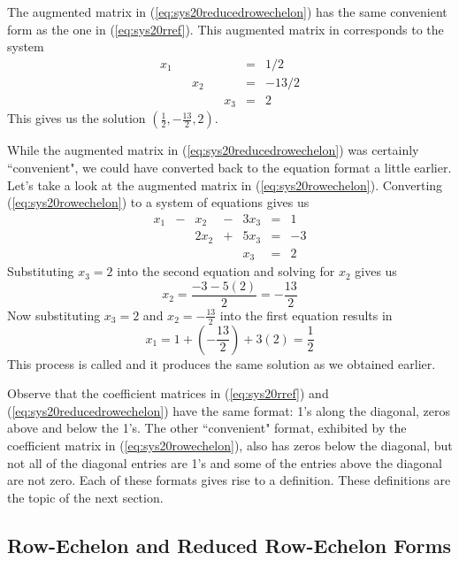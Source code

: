 \documentclass{ximera}
\begin{document}
\begin{exploration}
The augmented matrix in (\ref{eq:sys20reducedrowechelon}) has the same convenient form as the one in (\ref{eq:sys20rref}).  This augmented matrix in corresponds to the system
\begin{equation*}
    \begin{array}{ccccccc}
      x_1 & &&&&= &1/2 \\
   & &x_2&&&=&-13/2\\
   & &&&x_3&=&2
        \end{array}
    \end{equation*}
This gives us the solution $(\frac{1}{2}, -\frac{13}{2}, 2)$.

While the augmented matrix in (\ref{eq:sys20reducedrowechelon}) was certainly ``convenient", we could have converted back to the equation format a little earlier.  Let's take a look at the augmented matrix in (\ref{eq:sys20rowechelon}).  Converting (\ref{eq:sys20rowechelon}) to a system of equations gives us
\begin{equation*}
    \begin{array}{ccccccc}
      x_1 &- &x_2&-&3x_3&= &1\\
   & &2x_2&+&5x_3&=&-3\\
   & &&&x_3&=&2
        \end{array}
    \end{equation*}
Substituting $x_3=2$ into the second equation and solving for $x_2$ gives us $$x_2=\frac{-3-5(2)}{2}=-\frac{13}{2}$$  Now substituting $x_3=2$ and $x_2=-\frac{13}{2}$ into the first equation results in $$x_1=1+\left(-\frac{13}{2}\right)+3(2)=\frac{1}{2}$$  This process is called  and it produces the same solution as we obtained earlier.
\end{exploration}

Observe that the coefficient matrices in (\ref{eq:sys20rref}) and (\ref{eq:sys20reducedrowechelon}) have the same format: 1's along the diagonal, zeros above and below the 1's.  The other ``convenient" format, exhibited by the coefficient matrix in (\ref{eq:sys20rowechelon}),  also has zeros below the diagonal, but not all of the diagonal entries are 1's and some of the entries above the diagonal are not zero.  Each of these formats gives rise to a definition.  These definitions are the topic of the next section.


\subsection*{Row-Echelon and Reduced Row-Echelon Forms}
\end{document}
